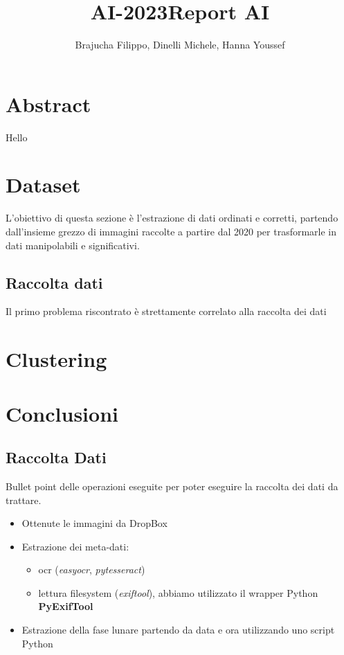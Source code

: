 \title{AI-2023}\documentclass[12pt,a4paper,twoside]{article}
\author{Brajucha Filippo, Dinelli Michele, Hanna Youssef}
\title{Report AI}
\begin{document}
\maketitle

\section*{Abstract}
Hello

\newpage

\tableofcontents

\newpage

\section{Dataset}
L'obiettivo di questa sezione è l'estrazione di dati ordinati e corretti, partendo dall'insieme grezzo di immagini 
raccolte a partire dal 2020 per trasformarle in dati manipolabili e significativi.

\subsection{Raccolta dati}
Il primo problema riscontrato è strettamente correlato alla raccolta dei dati

\section{Clustering}

\section{Conclusioni}

\subsection{Raccolta Dati}
Bullet point delle operazioni eseguite per poter eseguire la raccolta dei dati da trattare.
\begin{itemize}
    \item Ottenute le immagini da DropBox
    \item Estrazione dei meta-dati:
    \begin{itemize}
        \item ocr (\textit{easyocr}, \textit{pytesseract})
        \item lettura filesystem (\textit{exiftool}), abbiamo utilizzato il wrapper Python \textbf{PyExifTool}
    \end{itemize}
    \item Estrazione della fase lunare partendo da data e ora utilizzando uno script Python
\end{itemize}
\end{document}
